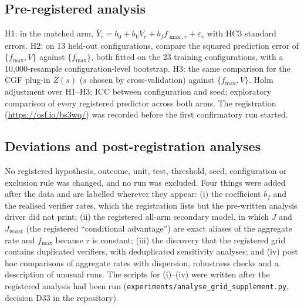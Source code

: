 \documentclass[11pt]{article}
\newcommand{\fmax}{f_{\max}}
\begin{document}
\subsection{Pre-registered analysis}
H1: in the matched arm, $\bar Y_r=b_0+b_V V_r+b_f f_{\max,r}+\varepsilon_r$ with HC3 standard errors.
H2: on 13 held-out configurations, compare the squared prediction error of $\{\fmax,V\}$ against $\{\fmax\}$, both fitted on the 23 training configurations, with a 10{,}000-resample configuration-level bootstrap.
H3: the same comparison for the CGF plug-in $Z(s)$ ($s$ chosen by cross-validation) against $\{\fmax,V\}$.
Holm adjustment over H1--H3; ICC between configuration and seed; exploratory comparison of every registered predictor across both arms.
The registration (\url{https://osf.io/bs3wq/}) was recorded before the first confirmatory run started.

\subsection{Deviations and post-registration analyses}
No registered hypothesis, outcome, unit, test, threshold, seed, configuration or exclusion rule was changed, and no run was excluded. Four things were added after the data and are labelled wherever they appear: (i) the coefficient $b_f$ and the realised verifier rates, which the registration lists but the pre-written analysis driver did not print; (ii) the registered all-arm secondary model, in which $J$ and $J_{\text{worst}}$ (the registered ``conditional advantage'') are exact aliases of the aggregate rate and $\fmax$ because $\tau$ is constant; (iii) the discovery that the registered grid contains duplicated verifiers, with deduplicated sensitivity analyses; and (iv) post hoc comparisons of aggregate rates with dispersion, robustness checks and a description of unusual runs. The scripts for (i)--(iv) were written after the registered analysis had been run (\texttt{experiments/analyse\_grid\_supplement.py}, decision D33 in the repository).






\end{document}

